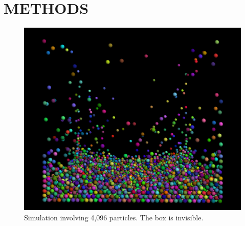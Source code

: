 %
%
%



\chapter{METHODS}




\begin{figure}[H]
\centering
  \includegraphics[scale=0.20]{figures/simulation.png}
  \captionsetup{justification=centering}
  \captionsetup{format=hang}
  \singlespace
  \caption{Simulation involving 4,096 particles. The box is invisible.}
\end{figure}

